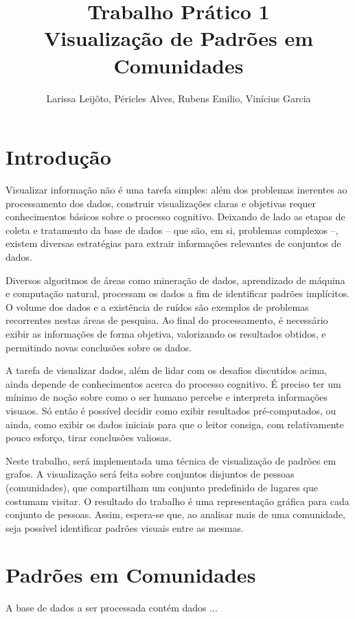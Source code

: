 \documentclass[12pt]{article}
\title{Trabalho Prático 1 \\ Visualização de Padrões em Comunidades}
\author{Larissa Leijôto, Péricles Alves, Rubens Emilio, Vinícius Garcia}
\begin{document}
\maketitle

\section{Introdução}
Visualizar informação não é uma tarefa simples: além dos problemas inerentes
ao processamento dos dados, construir visualizações claras e objetivas requer
conhecimentos básicos sobre o processo cognitivo.
Deixando de lado as etapas de coleta e tratamento da base de dados --
que são, em si, problemas complexos --, existem diversas estratégias para
extrair informações relevantes de conjuntos de dados.

Diversos algoritmos de áreas como mineração de dados, aprendizado de máquina
e computação natural, processam os dados a fim de identificar padrões
implícitos. O volume dos dados e a existência de ruídos são exemplos
de problemas recorrentes nestas áreas de pesquisa. Ao final do processamento,
é necessário exibir as informações de forma objetiva, valorizando os resultados
obtidos, e permitindo novas conclusões sobre os dados.

A tarefa de visualizar dados, além de lidar com os desafios discutidos
acima, ainda depende de conhecimentos acerca do processo cognitivo.
É preciso ter um mínimo de noção sobre como o ser humano percebe e interpreta
informações visuaos. Só então é possível decidir como exibir resultados
pré-computados, ou ainda, como exibir os dados iniciais para que o leitor
consiga, com relativamente pouco esforço, tirar conclusões valiosas.

Neste trabalho, será implementada uma técnica de visualização de padrões
em grafos. A visualização será feita sobre conjuntos disjuntos de pessoas
(comunidades), que compartilham um conjunto predefinido de lugares
que costumam visitar. O resultado do trabalho é uma representação gráfica
para cada conjunto de pessoas. Assim, espera-se que, ao analisar mais de uma
comunidade, seja possível identificar padrões visuais entre as mesmas.

\section{Padrões em Comunidades}
A base de dados a ser processada contém dados ...
\end{document}
